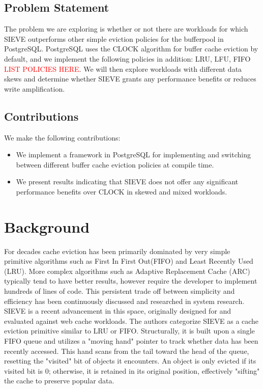 \documentclass[sigconf]{acmart}
\def\bad#1{\textcolor{red}{#1}}
\begin{document}
\subsection{Problem Statement}

The problem we are exploring is whether or not there are workloads for which SIEVE outperforms other simple eviction policies for the bufferpool in PostgreSQL. PostgreSQL uses the CLOCK algorithm for buffer cache eviction by default, and we implement the following policies in addition: LRU, LFU, FIFO \bad{LIST POLICIES HERE}. We will then explore workloads with different data skews and determine whether SIEVE grants any performance benefits or reduces write amplification.

\subsection{Contributions}

We make the following contributions:

\begin{itemize}
    \item We implement a framework in PostgreSQL for implementing and switching between different buffer cache eviction policies at compile time.
    \item We present results indicating that SIEVE does not offer any significant performance benefits over CLOCK in skewed and mixed workloads.
\end{itemize}


\section{Background}
For decades cache eviction has been primarily dominated by very simple primitive algorithms such as First In First Out(FIFO) and Least Recently Used (LRU). 
More complex algorithms such as Adaptive Replacement Cache (ARC) typically tend to have better results, however require the developer to implement hundreds of lines of code. 
This persistent trade off between simplicity and efficiency has been continuously discussed and researched in system research. 
\cite{SIEVE}SIEVE is a recent advancement in this space, originally designed for and evaluated against web cache workloads. 
The authors categorize SIEVE as a cache eviction primitive similar to LRU or FIFO. Structurally, it is built upon a single FIFO queue and utilizes a "moving hand" pointer to track whether data has been recently accessed. 
This hand scans from the tail toward the head of the queue, resetting the "visited" bit of objects it encounters. An object is only evicted if its visited bit is 0; otherwise, it is retained in its original position, effectively "sifting" the cache to preserve popular data. 
\end{document}
